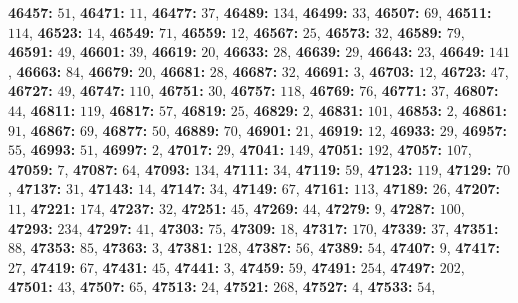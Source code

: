 \textsf{\bfseries 46457:} $51$, \textsf{\bfseries 46471:} $11$, \textsf{\bfseries 46477:} $37$, \textsf{\bfseries 46489:} $134$, \textsf{\bfseries 46499:} $33$, \textsf{\bfseries 46507:} $69$, \textsf{\bfseries 46511:} $114$, \textsf{\bfseries 46523:} $14$, \textsf{\bfseries 46549:} $71$, \textsf{\bfseries 46559:} $12$, \textsf{\bfseries 46567:} $25$, \textsf{\bfseries 46573:} $32$, \textsf{\bfseries 46589:} $79$, \textsf{\bfseries 46591:} $49$, \textsf{\bfseries 46601:} $39$, \textsf{\bfseries 46619:} $20$, \textsf{\bfseries 46633:} $28$, \textsf{\bfseries 46639:} $29$, \textsf{\bfseries 46643:} $23$, \textsf{\bfseries 46649:} $141$, \textsf{\bfseries 46663:} $84$, \textsf{\bfseries 46679:} $20$, \textsf{\bfseries 46681:} $28$, \textsf{\bfseries 46687:} $32$, \textsf{\bfseries 46691:} $3$, \textsf{\bfseries 46703:} $12$, \textsf{\bfseries 46723:} $47$, \textsf{\bfseries 46727:} $49$, \textsf{\bfseries 46747:} $110$, \textsf{\bfseries 46751:} $30$, \textsf{\bfseries 46757:} $118$, \textsf{\bfseries 46769:} $76$, \textsf{\bfseries 46771:} $37$, \textsf{\bfseries 46807:} $44$, \textsf{\bfseries 46811:} $119$, \textsf{\bfseries 46817:} $57$, \textsf{\bfseries 46819:} $25$, \textsf{\bfseries 46829:} $2$, \textsf{\bfseries 46831:} $101$, \textsf{\bfseries 46853:} $2$, \textsf{\bfseries 46861:} $91$, \textsf{\bfseries 46867:} $69$, \textsf{\bfseries 46877:} $50$, \textsf{\bfseries 46889:} $70$, \textsf{\bfseries 46901:} $21$, \textsf{\bfseries 46919:} $12$, \textsf{\bfseries 46933:} $29$, \textsf{\bfseries 46957:} $55$, \textsf{\bfseries 46993:} $51$, \textsf{\bfseries 46997:} $2$, \textsf{\bfseries 47017:} $29$, \textsf{\bfseries 47041:} $149$, \textsf{\bfseries 47051:} $192$, \textsf{\bfseries 47057:} $107$, \textsf{\bfseries 47059:} $7$, \textsf{\bfseries 47087:} $64$, \textsf{\bfseries 47093:} $134$, \textsf{\bfseries 47111:} $34$, \textsf{\bfseries 47119:} $59$, \textsf{\bfseries 47123:} $119$, \textsf{\bfseries 47129:} $70$, \textsf{\bfseries 47137:} $31$, \textsf{\bfseries 47143:} $14$, \textsf{\bfseries 47147:} $34$, \textsf{\bfseries 47149:} $67$, \textsf{\bfseries 47161:} $113$, \textsf{\bfseries 47189:} $26$, \textsf{\bfseries 47207:} $11$, \textsf{\bfseries 47221:} $174$, \textsf{\bfseries 47237:} $32$, \textsf{\bfseries 47251:} $45$, \textsf{\bfseries 47269:} $44$, \textsf{\bfseries 47279:} $9$, \textsf{\bfseries 47287:} $100$, \textsf{\bfseries 47293:} $234$, \textsf{\bfseries 47297:} $41$, \textsf{\bfseries 47303:} $75$, \textsf{\bfseries 47309:} $18$, \textsf{\bfseries 47317:} $170$, \textsf{\bfseries 47339:} $37$, \textsf{\bfseries 47351:} $88$, \textsf{\bfseries 47353:} $85$, \textsf{\bfseries 47363:} $3$, \textsf{\bfseries 47381:} $128$, \textsf{\bfseries 47387:} $56$, \textsf{\bfseries 47389:} $54$, \textsf{\bfseries 47407:} $9$, \textsf{\bfseries 47417:} $27$, \textsf{\bfseries 47419:} $67$, \textsf{\bfseries 47431:} $45$, \textsf{\bfseries 47441:} $3$, \textsf{\bfseries 47459:} $59$, \textsf{\bfseries 47491:} $254$, \textsf{\bfseries 47497:} $202$, \textsf{\bfseries 47501:} $43$, \textsf{\bfseries 47507:} $65$, \textsf{\bfseries 47513:} $24$, \textsf{\bfseries 47521:} $268$, \textsf{\bfseries 47527:} $4$, \textsf{\bfseries 47533:} $54$, 
